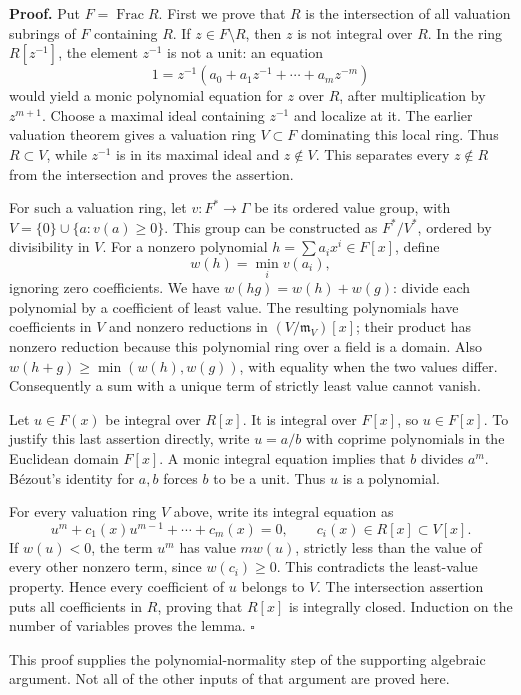 \documentclass[11pt]{article}
\begin{document}
\textbf{Proof.} Put \(F=\operatorname{Frac}R\). First we prove that
\(R\) is the intersection of all valuation subrings of \(F\) containing
\(R\). If \(z\in F\setminus R\), then \(z\) is not integral over \(R\).
In the ring \(R[z^{-1}]\), the element \(z^{-1}\) is not a unit: an
equation \[
1=z^{-1}(a_0+a_1z^{-1}+\cdots+a_mz^{-m})
\] would yield a monic polynomial equation for \(z\) over \(R\), after
multiplication by \(z^{m+1}\). Choose a maximal ideal containing
\(z^{-1}\) and localize at it. The earlier valuation theorem gives a
valuation ring \(V\subset F\) dominating this local ring. Thus
\(R\subset V\), while \(z^{-1}\) is in its maximal ideal and
\(z\notin V\). This separates every \(z\notin R\) from the intersection
and proves the assertion.

For such a valuation ring, let \(v:F^*\to\Gamma\) be its ordered value
group, with \(V=\{0\}\cup\{a:v(a)\geq0\}\). This group can be
constructed as \(F^*/V^*\), ordered by divisibility in \(V\). For a
nonzero polynomial \(h=\sum a_ix^i\in F[x]\), define \[
w(h)=\min_i v(a_i),
\] ignoring zero coefficients. We have \(w(hg)=w(h)+w(g)\): divide each
polynomial by a coefficient of least value. The resulting polynomials
have coefficients in \(V\) and nonzero reductions in
\((V/\mathfrak m_V)[x]\); their product has nonzero reduction because
this polynomial ring over a field is a domain. Also
\(w(h+g)\geq\min(w(h),w(g))\), with equality when the two values differ.
Consequently a sum with a unique term of strictly least value cannot
vanish.

Let \(u\in F(x)\) be integral over \(R[x]\). It is integral over
\(F[x]\), so \(u\in F[x]\). To justify this last assertion directly,
write \(u=a/b\) with coprime polynomials in the Euclidean domain
\(F[x]\). A monic integral equation implies that \(b\) divides \(a^m\).
Bézout's identity for \(a,b\) forces \(b\) to be a unit. Thus \(u\) is a
polynomial.

For every valuation ring \(V\) above, write its integral equation as \[
u^m+c_1(x)u^{m-1}+\cdots+c_m(x)=0,
\qquad c_i(x)\in R[x]\subset V[x].
\] If \(w(u)<0\), the term \(u^m\) has value \(m w(u)\), strictly less
than the value of every other nonzero term, since \(w(c_i)\geq0\). This
contradicts the least-value property. Hence every coefficient of \(u\)
belongs to \(V\). The intersection assertion puts all coefficients in
\(R\), proving that \(R[x]\) is integrally closed. Induction on the
number of variables proves the lemma. \(\square\)

This proof supplies the polynomial-normality step of the supporting
algebraic argument. Not all of the other inputs of that argument are
proved here.
\end{document}
